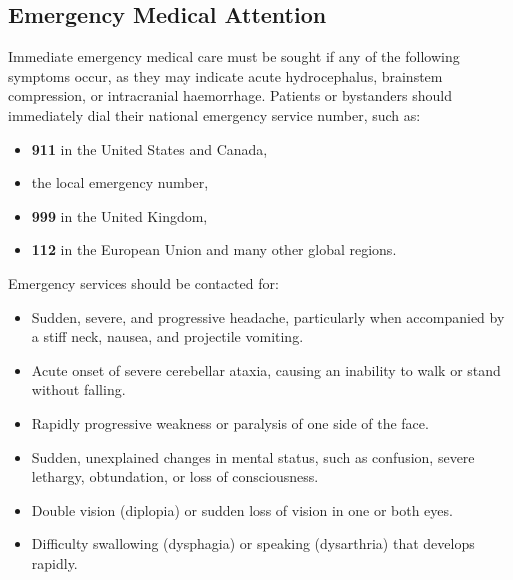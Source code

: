 \subsection*{Emergency Medical Attention}
Immediate emergency medical care must be sought if any of the following symptoms occur, as they may indicate acute hydrocephalus, brainstem compression, or intracranial haemorrhage. Patients or bystanders should immediately dial their national emergency service number, such as:
\begin{itemize}
    \item \textbf{911} in the United States and Canada,
    \item the local emergency number,
    \item \textbf{999} in the United Kingdom,
    \item \textbf{112} in the European Union and many other global regions.
\end{itemize}
Emergency services should be contacted for:
\begin{itemize}
    \item Sudden, severe, and progressive headache, particularly when accompanied by a stiff neck, nausea, and projectile vomiting.
    \item Acute onset of severe cerebellar ataxia, causing an inability to walk or stand without falling.
    \item Rapidly progressive weakness or paralysis of one side of the face.
    \item Sudden, unexplained changes in mental status, such as confusion, severe lethargy, obtundation, or loss of consciousness.
    \item Double vision (diplopia) or sudden loss of vision in one or both eyes.
    \item Difficulty swallowing (dysphagia) or speaking (dysarthria) that develops rapidly.
\end{itemize}

